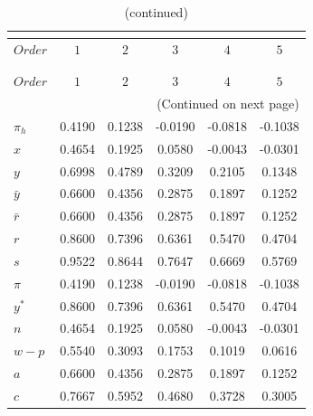 
\begin{center}
\begin{longtable}{lccccc} 
\caption{COEFFICIENTS OF AUTOCORRELATION}\\
 \label{Table:th_autocorr_matrix}\\
\toprule 
$Order     $	 & 	 $         1$	 & 	 $         2$	 & 	 $         3$	 & 	 $         4$	 & 	 $         5$\\
\midrule \endfirsthead 
\caption{(continued)}\\
 \toprule \\ 
$Order     $	 & 	 $         1$	 & 	 $         2$	 & 	 $         3$	 & 	 $         4$	 & 	 $         5$\\
\midrule \endhead 
\midrule \multicolumn{6}{r}{(Continued on next page)} \\ \bottomrule \endfoot 
\bottomrule \endlastfoot 
${\pi_h}   $	 & 	    0.4190	 & 	    0.1238	 & 	   -0.0190	 & 	   -0.0818	 & 	   -0.1038 \\ 
$x         $	 & 	    0.4654	 & 	    0.1925	 & 	    0.0580	 & 	   -0.0043	 & 	   -0.0301 \\ 
$y         $	 & 	    0.6998	 & 	    0.4789	 & 	    0.3209	 & 	    0.2105	 & 	    0.1348 \\ 
${\bar y}  $	 & 	    0.6600	 & 	    0.4356	 & 	    0.2875	 & 	    0.1897	 & 	    0.1252 \\ 
${\bar r}  $	 & 	    0.6600	 & 	    0.4356	 & 	    0.2875	 & 	    0.1897	 & 	    0.1252 \\ 
$r         $	 & 	    0.8600	 & 	    0.7396	 & 	    0.6361	 & 	    0.5470	 & 	    0.4704 \\ 
$s         $	 & 	    0.9522	 & 	    0.8644	 & 	    0.7647	 & 	    0.6669	 & 	    0.5769 \\ 
${\pi}     $	 & 	    0.4190	 & 	    0.1238	 & 	   -0.0190	 & 	   -0.0818	 & 	   -0.1038 \\ 
${y^*}     $	 & 	    0.8600	 & 	    0.7396	 & 	    0.6361	 & 	    0.5470	 & 	    0.4704 \\ 
${n}       $	 & 	    0.4654	 & 	    0.1925	 & 	    0.0580	 & 	   -0.0043	 & 	   -0.0301 \\ 
${w-p}     $	 & 	    0.5540	 & 	    0.3093	 & 	    0.1753	 & 	    0.1019	 & 	    0.0616 \\ 
$a         $	 & 	    0.6600	 & 	    0.4356	 & 	    0.2875	 & 	    0.1897	 & 	    0.1252 \\ 
$c         $	 & 	    0.7667	 & 	    0.5952	 & 	    0.4680	 & 	    0.3728	 & 	    0.3005 \\ 
\end{longtable}
 \end{center}
